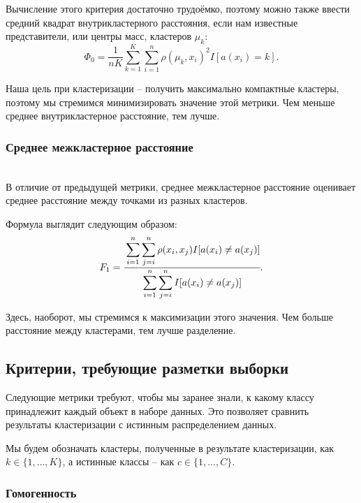Вычисление этого критерия достаточно трудоёмко, поэтому можно также ввести средний квадрат внутрикластерного расстояния, если нам известные представители, или центры масс, кластеров $\mu_k$:
\begin{equation*}
     \Phi_0 = \displaystyle\frac{1}{nK} \sum_{k=1}^K \sum_{i=1}^n \rho(\mu_k,  x_i)^2 I[a(x_i)=k].
\end{equation*}

Наша цель при кластеризации -- получить максимально компактные кластеры, поэтому мы стремимся минимизировать значение этой метрики.  Чем меньше среднее внутрикластерное расстояние, тем лучше.

\subsubsection{Среднее межкластерное расстояние} \hfill\\

В отличие от предыдущей метрики, среднее межкластерное расстояние оценивает среднее расстояние между точками из разных кластеров.  

Формула выглядит следующим образом:
\begin{equation*}
     F_1 = \cfrac{\displaystyle\sum_{i=1}^n \sum_{j=i}^n \rho(x_i,  x_j) I[a(  x_i)\ne a(x_j)]}{\displaystyle\sum_{i=1}^n \sum _ {j=i}^n I[ a(x_i)\ne a(x_j)]}.
\end{equation*}

Здесь, наоборот, мы стремимся к максимизации этого значения.  Чем больше расстояние между кластерами, тем лучше разделение.  

\subsection{Критерии, требующие разметки выборки}

Следующие метрики требуют, чтобы мы заранее знали, к какому классу принадлежит каждый объект в наборе данных.  Это позволяет сравнить результаты кластеризации с истинным распределением данных.

Мы будем обозначать кластеры, полученные в результате кластеризации, как $k \in \{1, \ldots, K\}$, а истинные классы -- как $c \in \{1, \ldots, C\}$.

\subsubsection{Гомогенность} \hfill\\


